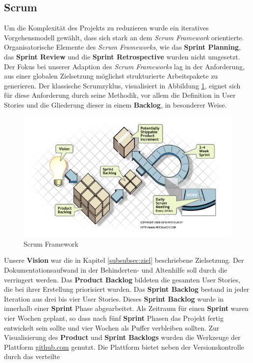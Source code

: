 \subsection{Scrum}
Um die Komplexität des Projekts zu reduzieren wurde ein iteratives Vorgehensmodell gewählt, dass sich stark an dem \textit{Scrum Framework}
orientierte. Organisatorische Elemente des \textit{Scrum Frameworks}, wie das \textbf{Sprint Planning}, das \textbf{Sprint Review} und die
\textbf{Sprint Retrospective} wurden nicht umgesetzt. Der Fokus bei unserer Adaption des \textit{Scrum Frameworks} lag in der Anforderung, aus einer
globalen Zielsetzung möglichst strukturierte Arbeitspakete zu generieren. Der klassische Scrumzyklus, visualisiert in Abbildung \ref{ScrumFramework},
eignet sich für diese Anforderung durch seine Methodik, vor allem die Definition in User Stories und die Gliederung dieser in einem
\textbf{Backlog}, in besonderer Weise.\\
\begin{figure}[htp]
	\includegraphics[width=\textwidth]{ScrumFrameworkFlow}
	\caption{Scrum Framework}
	\label{ScrumFramework}
\end{figure}
Unsere \textbf{Vision} war die in Kapitel \ref{subsubsec:ziel} beschriebene Zielsetzung. Der Dokumentationsaufwand in der Behinderten- und Altenhilfe
soll durch die \EBP verringert werden. Das \textbf{Product Backlog} bildeten die gesamten User Stories, die bei ihrer Erstellung priorisiert wurden.
Das \textbf{Sprint Backlog} bestand in jeder Iteration aus drei bis vier User Stories. Dieses \textbf{Sprint Backlog} wurde in innerhalb einer
\textbf{Sprint} Phase abgearbeitet. Als Zeitraum für einen \textbf{Sprint} waren vier Wochen geplant, so dass nach fünf \textbf{Sprint} Phasen das
Projekt fertig entwickelt sein sollte und vier Wochen als Puffer verbleiben sollten. Zur Visualisierung des \textbf{Product} und \textbf{Sprint
Backlogs} wurden die Werkzeuge der Plattform \url{github.com} genutzt. Die Plattform bietet neben der Versionskontrolle durch das verteilte
